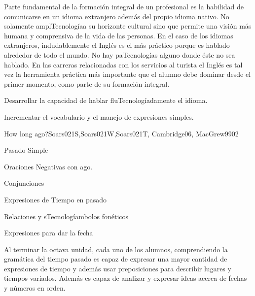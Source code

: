 \begin{syllabus}


\begin{justification}
Parte fundamental de la formación integral de un profesional es la habilidad de 
comunicarse en un idioma extranjero además del propio idioma nativo. No solamente 
amplTecnologíaa su horizonte cultural sino que permite una visión más humana y comprensiva 
de la vida de las personas. En el caso de los idiomas extranjeros, indudablemente 
el Inglés es el más práctico porque es hablado alrededor de todo el mundo. No hay 
paTecnologías alguno donde éste no sea hablado. En las carreras relacionadas con los 
servicios al turista el Inglés es tal vez la herramienta práctica más importante 
que el alumno debe dominar desde el primer momento, como parte de su formación 
integral.
\end{justification}

\begin{goals}
\item Desarrollar la capacidad de hablar fluTecnologíadamente el idioma.
\item Incrementar el vocabulario y el manejo de expresiones simples.
\end{goals}

\begin{outcomes}
\end{outcomes}

\begin{unit}{How long ago?}{Soars021S,Soars021W,Soars021T, Cambridge06, MacGrew99}{0}{2}
   \begin{topics}
      \item Pasado Simple
      \item Oraciones Negativas con ago.
      \item Conjunciones
      \item Expresiones de Tiempo en pasado
      \item Relaciones y sTecnologíambolos fonéticos
      \item Expresiones para dar la fecha
   \end{topics}

   \begin{unitgoals}
      \item Al terminar la octava unidad, cada uno de los alumnos, comprendiendo la gramática del tiempo pasado es capaz de expresar una mayor cantidad de expresiones de tiempo y además usar preposiciones para describir lugares y tiempos variados. Además es capaz de analizar y expresar ideas acerca de fechas y números en orden. 
   \end{unitgoals}


\end{unit}
\end{syllabus}
